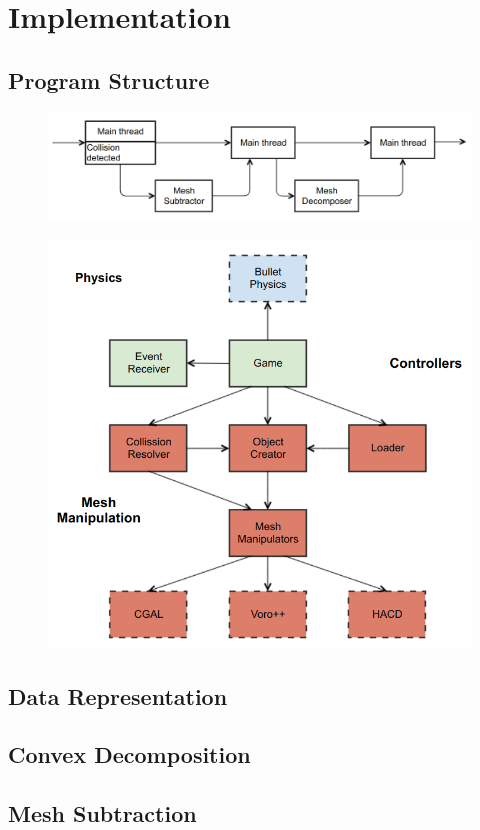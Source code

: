 \chapter{Implementation}

\section{Program Structure}
\begin{figure}[ht!]
        \centering
        \includegraphics[width=\textwidth]{img/destructionFlow}
        \caption{}
        \label{fig:destFlow}
\end{figure}

\begin{figure}
        \centering
        \includegraphics[width=\textwidth]{img/objectmodel}
        \caption{}
        \label{fig:modules}
\end{figure}

\section{Data Representation}

\section{Convex Decomposition}

\section{Mesh Subtraction}
